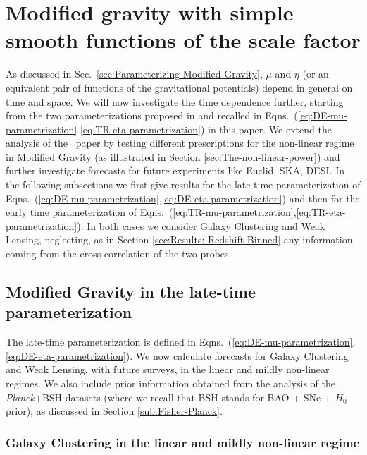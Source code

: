 \section{Modified gravity with simple smooth functions of the scale factor}

As discussed in Sec.\ \ref{sec:Parameterizing-Modified-Gravity}, $\mu$ and $\eta$ (or an equivalent pair of functions of the gravitational potentials) depend in general on time and space. We will now investigate the time dependence further, starting from the two parameterizations proposed in \cite{planck_collaboration_planck_2016} and recalled in Eqns.\ (\ref{eq:DE-mu-parametrization}-\ref{eq:TR-eta-parametrization}) in this paper. We extend the analysis of the \planck\ paper by testing different prescriptions for the non-linear regime in Modified Gravity (as illustrated in Section \ref{sec:The-non-linear-power}) and further investigate forecasts for future experiments like Euclid, SKA, DESI. In the following subsections we first give results for the late-time parameterization of Eqns.\ (\ref{eq:DE-mu-parametrization},\ref{eq:DE-eta-parametrization}) and then for the early time parameterization of Eqns.\ (\ref{eq:TR-mu-parametrization},\ref{eq:TR-eta-parametrization}). In both cases we consider Galaxy Clustering and Weak Lensing, neglecting, as in Section \ref{sec:Results:-Redshift-Binned} any information coming from the cross correlation of the two probes.

\subsection{\label{sub:MG-DE}Modified Gravity in the late-time parameterization}
The late-time parameterization is defined in Eqns.\ (\ref{eq:DE-mu-parametrization},\ref{eq:DE-eta-parametrization}). We now calculate forecasts for Galaxy Clustering and Weak Lensing, with future surveys, in the linear and mildly non-linear regimes.
We also include prior information obtained from
the analysis of the {\it Planck}+BSH datasets (where we recall that BSH stands for BAO + SNe + $H_0$ prior),
as discussed in Section \ref{sub:Fisher-Planck}.

\subsubsection{Galaxy Clustering in the linear and mildly non-linear regime}

